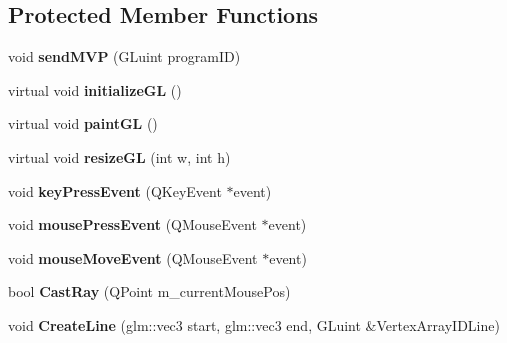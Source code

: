 \subsection*{Protected Member Functions}
\begin{DoxyCompactItemize}
\item 
\hypertarget{classGameView3D_ae077404d42f477162b3540da397a8ad4}{void {\bfseries send\-M\-V\-P} (G\-Luint program\-I\-D)}\label{classGameView3D_ae077404d42f477162b3540da397a8ad4}

\item 
\hypertarget{classGameView3D_ae6db5f0d969ca92280e4dc6c7092e11e}{virtual void {\bfseries initialize\-G\-L} ()}\label{classGameView3D_ae6db5f0d969ca92280e4dc6c7092e11e}

\item 
\hypertarget{classGameView3D_ad69d664507756b94cc64ab65581528c4}{virtual void {\bfseries paint\-G\-L} ()}\label{classGameView3D_ad69d664507756b94cc64ab65581528c4}

\item 
\hypertarget{classGameView3D_ad08f12d05b40dbbb42172783fb4ffe5f}{virtual void {\bfseries resize\-G\-L} (int w, int h)}\label{classGameView3D_ad08f12d05b40dbbb42172783fb4ffe5f}

\item 
\hypertarget{classGameView3D_abeb74e91cd820d7af1e62c714fc1864f}{void {\bfseries key\-Press\-Event} (Q\-Key\-Event $\ast$event)}\label{classGameView3D_abeb74e91cd820d7af1e62c714fc1864f}

\item 
\hypertarget{classGameView3D_a2a66712712d355039299efb5513fbeb2}{void {\bfseries mouse\-Press\-Event} (Q\-Mouse\-Event $\ast$event)}\label{classGameView3D_a2a66712712d355039299efb5513fbeb2}

\item 
\hypertarget{classGameView3D_a16eb2fd0448d2f50b1c5287f86ac9437}{void {\bfseries mouse\-Move\-Event} (Q\-Mouse\-Event $\ast$event)}\label{classGameView3D_a16eb2fd0448d2f50b1c5287f86ac9437}

\item 
\hypertarget{classGameView3D_aa4d6e119510fc03c95d52282579ca8ed}{bool {\bfseries Cast\-Ray} (Q\-Point m\-\_\-current\-Mouse\-Pos)}\label{classGameView3D_aa4d6e119510fc03c95d52282579ca8ed}

\item 
\hypertarget{classGameView3D_a31d588b55fd79e52732a28ccd196733c}{void {\bfseries Create\-Line} (glm\-::vec3 start, glm\-::vec3 end, G\-Luint \&Vertex\-Array\-I\-D\-Line)}\label{classGameView3D_a31d588b55fd79e52732a28ccd196733c}


\end{DoxyCompactItemize}
